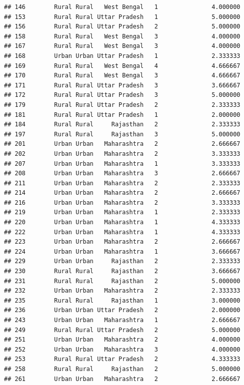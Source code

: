 \documentclass[
]{article}
\begin{document}
\begin{verbatim}
## 146        Rural Rural   West Bengal   1               4.000000
## 153        Rural Rural Uttar Pradesh   1               5.000000
## 156        Rural Rural Uttar Pradesh   2               5.000000
## 158        Rural Rural   West Bengal   3               4.000000
## 167        Rural Rural   West Bengal   3               4.000000
## 168        Urban Urban Uttar Pradesh   1               2.333333
## 169        Rural Rural   West Bengal   4               4.666667
## 170        Rural Rural   West Bengal   3               4.666667
## 171        Rural Rural Uttar Pradesh   3               3.666667
## 172        Rural Rural Uttar Pradesh   3               5.000000
## 179        Rural Rural Uttar Pradesh   2               2.333333
## 181        Rural Rural Uttar Pradesh   1               2.000000
## 184        Rural Rural     Rajasthan   2               2.333333
## 197        Rural Rural     Rajasthan   3               5.000000
## 201        Urban Urban   Maharashtra   2               2.666667
## 202        Urban Urban   Maharashtra   2               3.333333
## 207        Urban Urban   Maharashtra   1               3.333333
## 208        Urban Urban   Maharashtra   3               2.666667
## 211        Urban Urban   Maharashtra   2               2.333333
## 214        Urban Urban   Maharashtra   2               2.666667
## 216        Urban Urban   Maharashtra   2               3.333333
## 219        Urban Urban   Maharashtra   1               2.333333
## 220        Urban Urban   Maharashtra   1               4.333333
## 222        Urban Urban   Maharashtra   1               4.333333
## 223        Urban Urban   Maharashtra   2               2.666667
## 224        Urban Urban   Maharashtra   1               3.666667
## 229        Urban Urban     Rajasthan   2               2.333333
## 230        Rural Rural     Rajasthan   2               3.666667
## 231        Rural Rural     Rajasthan   2               5.000000
## 232        Urban Urban   Maharashtra   2               2.333333
## 235        Rural Rural     Rajasthan   1               3.000000
## 236        Urban Urban Uttar Pradesh   2               2.000000
## 243        Urban Urban   Maharashtra   1               2.666667
## 249        Rural Rural Uttar Pradesh   2               5.000000
## 251        Urban Urban   Maharashtra   2               4.000000
## 252        Urban Urban   Maharashtra   3               4.000000
## 253        Rural Rural Uttar Pradesh   2               4.333333
## 258        Rural Rural     Rajasthan   2               5.000000
## 261        Urban Urban   Maharashtra   2               2.666667

\end{verbatim}
\end{document}
